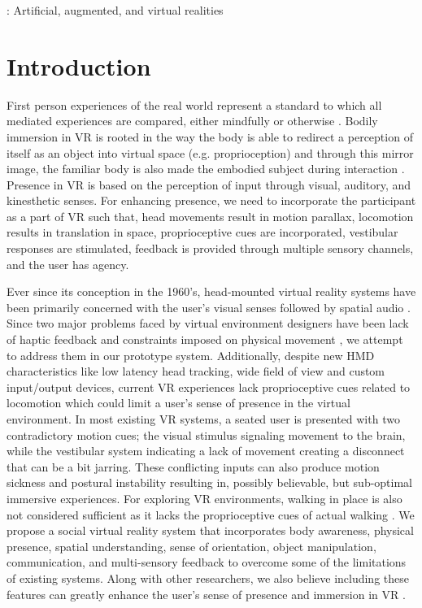 \documentclass{sigchi}
\begin{document}
\vspace{-1em}
: {Artificial, augmented, and virtual realities }


\section{Introduction}

First person experiences of the real world represent a standard to which all mediated experiences are compared, either mindfully or otherwise \cite{steuer1995defining}. Bodily immersion in VR is rooted in the way the body is able to redirect a perception of itself as an object into virtual space (e.g. proprioception) and through this mirror image, the familiar body is also made the embodied subject during interaction \cite{sageng2012philosophy}. Presence in VR is based on the perception of input through visual, auditory, and kinesthetic senses. For enhancing presence, we need to incorporate the participant as a part of VR such that, head movements result in motion parallax, locomotion results in translation in space, proprioceptive cues are incorporated, vestibular responses are stimulated, feedback is provided through multiple sensory channels, and the user has agency. 

Ever since its conception in the 1960's, head-mounted virtual reality systems have been primarily concerned with the user's visual senses \cite{sutherland1968head} followed by spatial audio \cite{begault19943}.  Since two major problems faced by virtual environment designers have been lack of haptic feedback and constraints imposed on physical movement \cite{kohli2005combining}, we attempt to address them in our prototype system. Additionally, despite new HMD characteristics like low latency head tracking, wide field of view and custom input/output devices, current VR experiences lack proprioceptive cues related to locomotion which could limit a user's sense of presence in the virtual environment. In most existing VR systems, a seated user is presented with two contradictory motion cues; the visual stimulus signaling movement to the brain, while the vestibular system indicating a lack of movement creating a disconnect that can be a bit jarring. These conflicting inputs can also produce motion sickness and postural instability \cite{kennedy1996postural} resulting in, possibly believable, but sub-optimal immersive experiences. For exploring VR environments, walking in place is also not considered sufficient as it lacks the proprioceptive cues of actual walking \cite{williams2007exploring}. We propose a social virtual reality system that incorporates body awareness, physical presence, spatial understanding, sense of orientation, object manipulation, communication, and multi-sensory feedback to overcome some of the limitations of existing systems. Along with other researchers, we also believe including these features can greatly enhance the user's sense of presence and immersion in VR \cite{brooks1999s}.
\end{document}
